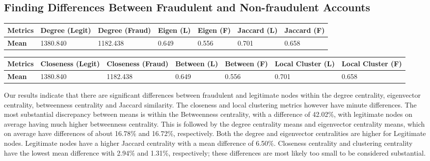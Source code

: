 \documentclass{styles/svproc}
\begin{document}
\bigskip
{}


\subsection{Finding Differences Between Fraudulent and Non-fraudulent Accounts}

\bigskip
\begin{tabular}{ | m{1.55cm} | m{1.65cm}| m{1.65cm}| m{1.65cm}| m{1.65cm}| m{1.65cm}| m{1.65cm}|}
  \hline
  \textbf{Metrics} & \textbf{Degree (Legit)} & \textbf{Degree (Fraud)} & \textbf{Eigen (L)} & \textbf{Eigen (F)} & \textbf{Jaccard (L)} & \textbf{Jaccard (F)}\\ 
  \hline
  \textbf{Mean} & 1380.840 & 1182.438 & 0.649 & 0.556 & 0.701 & 0.658\\ 
  \hline
\end{tabular}

\bigskip
{}


\bigskip
\noindent
\begin{tabular}{ | m{1.55cm} | m{1.7cm}| m{1.7cm}| m{1.6cm}| m{1.6cm}| m{1.7cm}| m{1.7cm}|}
\hline
\textbf{Metrics} & \textbf{Closeness (Legit)} & \textbf{Closeness (Fraud)} & \textbf{Between (L)} & \textbf{Between (F)} & \textbf{Local Cluster (L)} & \textbf{Local Cluster (F)}\\ 
\hline
\textbf{Mean} & 1380.840 & 1182.438 & 0.649 & 0.556 & 0.701 & 0.658\\ 
\hline
\end{tabular}

\bigskip
{}

\bigskip
\noindent Our results indicate that there are significant differences between fraudulent and legitimate nodes within the degree centrality, eigenvector centrality, betweenness centrality and Jaccard similarity. The closeness and local clustering metrics however have minute differences.
The most substantial discrepancy between means is within the Betweenness centrality, with a difference of 42.02\%, with legitimate nodes on average having much higher betweenness centrality. This is followed by the degree centrality means and eigenvector centrality means, which on average have differences of about 16.78\% and 16.72\%, respectively. Both the degree and eigenvector centralities are higher for Legitimate nodes. Legitimate nodes have a higher Jaccard centrality with a mean difference of 6.50\%. Closeness centrality and clustering centrality have the lowest mean difference with 2.94\% and 1.31\%, respectively; these differences are most likely too small to be considered substantial.
\end{document}
